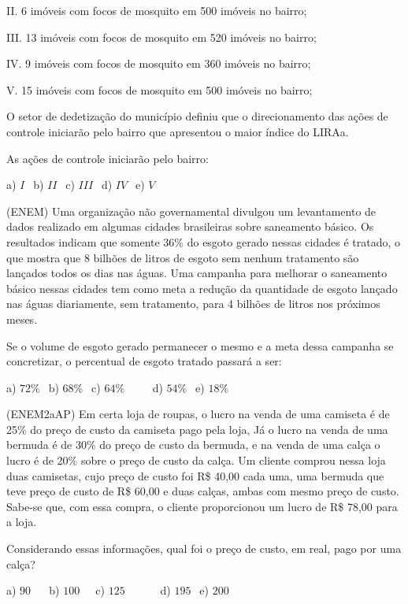 \begin{multicols*}{2}
		      II. 6 imóveis com focos de mosquito em 500 imóveis no bairro;

		      III. 13 imóveis com focos de mosquito em 520 imóveis no bairro;

		      IV. 9 imóveis com focos de mosquito em 360 imóveis no bairro;

		      V. 15 imóveis com focos de mosquito em 500 imóveis no bairro;

		      O setor de dedetização do município definiu que o direcionamento das ações de controle iniciarão pelo bairro
		      que apresentou o maior índice do LIRAa.

		      As ações de controle iniciarão pelo bairro:

		      a) $ I \ \ $ b) $ II \ \ $ c) $III \ \ $ d) $ IV \ \ $ e) $ V \ \ $

		\execnum (ENEM) Uma organização não governamental divulgou um levantamento de dados realizado em algumas cidades
		      brasileiras sobre saneamento básico. Os resultados indicam que somente 36\% do esgoto gerado nessas cidades é tratado, o que mostra que 8 bilhões de litros de esgoto sem nenhum tratamento são lançados todos os dias nas águas. Uma campanha para melhorar o saneamento básico nessas cidades tem como meta a redução da quantidade de esgoto lançado nas águas diariamente, sem tratamento, para 4 bilhões de litros nos próximos meses.

		      Se o volume de esgoto gerado permanecer o mesmo e a meta dessa campanha se concretizar, o percentual de esgoto tratado passará a ser:

		      a) $72\% \ \ $ b) $68\% \ \ $ c) $64\% \ \ \ \ \ \ \ \ \ \ $ d) $54\% \ \ $ e) $18\% \ \ $

		\execnum (ENEM2aAP) Em certa loja de roupas, o lucro na venda de uma camiseta é de 25\% do preço de custo da camiseta pago pela loja, Já o lucro na venda de uma bermuda é de 30\% do preço de custo da bermuda, e na venda de uma calça o lucro é de 20\% sobre o preço de custo da calça. Um cliente comprou nessa loja duas camisetas, cujo preço de custo foi R\$ 40,00 cada uma, uma bermuda que teve preço de custo de R\$ 60,00 e duas calças, ambas com mesmo
		      preço de custo. Sabe-se que, com essa compra, o cliente proporcionou um lucro de R\$ 78,00 para a loja.

		      Considerando essas informações, qual foi o preço de custo, em real, pago por uma calça?

		      a) $90 \ \ \ \ \ \ $ b) $100 \ \ \ \ \ $ c) $125 \ \ \ \ \ \ \ \ \ \ \ \ \ $ d) $195 \ \ $ e) $200 \ \ $


\end{multicols*}
